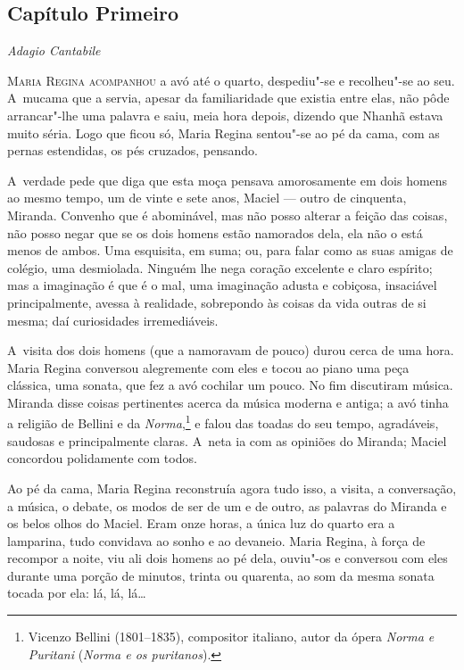 \begin{linenumbers}


\section{Capítulo Primeiro}

\emph{Adagio Cantabile}


\textsc{Maria Regina acompanhou} a avó até o quarto, despediu"-se e recolheu"-se ao
seu. A~mucama que a servia, apesar da familiaridade que existia entre
elas, não pôde arrancar"-lhe uma palavra e saiu, meia hora depois,
dizendo que Nhanhã estava muito séria. Logo que ficou só, Maria Regina
sentou"-se ao pé da cama, com as pernas estendidas, os pés cruzados,
pensando.

A~verdade pede que diga que esta moça pensava amorosamente em dois
homens ao mesmo tempo, um de vinte e sete anos, Maciel --- outro de
cinquenta, Miranda. Convenho que é abominável, mas não posso alterar a
feição das coisas, não posso negar que se os dois homens estão namorados
dela, ela não o está menos de ambos. Uma esquisita, em suma; ou, para
falar como as suas amigas de colégio, uma desmiolada. Ninguém lhe nega
coração excelente e claro espírito; mas a imaginação é que é o mal, uma
imaginação adusta e cobiçosa, insaciável principalmente, avessa à
realidade, sobrepondo às coisas da vida outras de si mesma; daí
curiosidades irremediáveis.

A~visita dos dois homens (que a namoravam de pouco) durou cerca de uma
hora. Maria Regina conversou alegremente com eles e tocou ao piano uma
peça clássica, uma sonata, que fez a avó cochilar um pouco. No fim
discutiram música. Miranda disse coisas pertinentes acerca da música
moderna e antiga; a avó tinha a religião de Bellini e da
\emph{Norma},\footnote{Vicenzo Bellini (1801--1835), compositor italiano,
  autor da ópera \emph{Norma e  Puritani} (\emph{Norma e os
  puritanos}).} e falou das toadas do seu tempo, agradáveis, saudosas e
principalmente claras. A~neta ia com as opiniões do Miranda; Maciel
concordou polidamente com todos.

Ao pé da cama, Maria Regina reconstruía agora tudo isso, a visita, a
conversação, a música, o debate, os modos de ser de um e de outro, as
palavras do Miranda e os belos olhos do Maciel. Eram onze horas, a única
luz do quarto era a lamparina, tudo convidava ao sonho e ao devaneio.
Maria Regina, à força de recompor a noite, viu ali dois homens ao pé
dela, ouviu"-os e conversou com eles durante uma porção de minutos,
trinta ou quarenta, ao som da mesma sonata tocada por ela: lá, lá, lá\ldots{}


\end{linenumbers}
